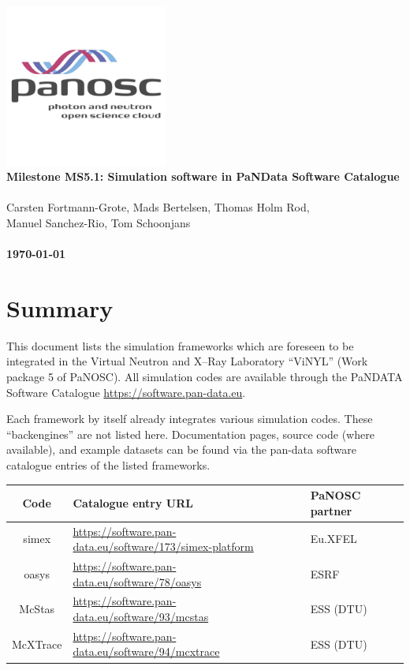 \documentclass[10pt]{scrartcl}
\begin{document}
\makeatletter
\begin{titlepage}
\thispagestyle{scrheadings}
\ohead{}
\ihead{}
\chead{}
\ifoot{}
\ofoot{}
\noindent%
\includegraphics[width=0.4\textwidth]{figures/PaNOSClogo_web_RGB_512x512.jpg}\\
\Huge{%
\renewcommand{\baselinestretch}{2.0}%
  \textbf{%
    Milestone MS5.1: Simulation software in PaNData Software Catalogue\\
  }%
}%
\\
{%
\Large{%
  Carsten Fortmann-Grote,
  Mads Bertelsen,
  Thomas Holm Rod,\\
  Manuel Sanchez-Rio,
  Tom Schoonjans
  \bigskip\\
  \bigskip\\
  \textbf{\today}%
}}%
\end{titlepage}
\makeatother


\section{Summary}

This document lists the simulation frameworks which are foreseen to be integrated in
the Virtual Neutron and X--Ray Laboratory ``ViNYL'' (Work package 5 of PaNOSC).
All simulation codes are available through the PaNDATA Software Catalogue
\url{https://software.pan-data.eu}.

Each framework by itself already integrates various simulation codes. These
``backengines'' are not listed here. Documentation pages, source code (where
available), and example datasets can be found via the pan-data software
catalogue entries of the listed frameworks.\\[5ex]
\begin{tabular}{|c|l|l|l|}
  \hline
  \textbf{Code} & \textbf{Catalogue entry URL} & \textbf{PaNOSC partner} \\
  \hline
  simex & \url{https://software.pan-data.eu/software/173/simex-platform} & Eu.XFEL \\
  oasys & \url{https://software.pan-data.eu/software/78/oasys} & ESRF \\
  McStas & \url{https://software.pan-data.eu/software/93/mcstas} & ESS (DTU) \\
  McXTrace & \url{https://software.pan-data.eu/software/94/mcxtrace} & ESS (DTU) \\
  \hline
\end{tabular}
\end{document}
